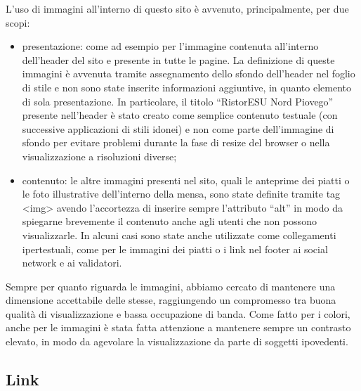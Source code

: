 \documentclass[10pt,a4paper,onecolumn]{article}
\begin{document}
L’uso di immagini all’interno di questo sito è avvenuto, principalmente, per due scopi:
\begin{itemize}
 \item presentazione: come ad esempio per l’immagine contenuta all’interno dell’header del sito e presente in tutte le pagine. La definizione di queste immagini è avvenuta tramite assegnamento dello sfondo dell’header nel foglio di stile e non sono state inserite informazioni aggiuntive, in quanto elemento di sola presentazione. In particolare, il titolo ``RistorESU Nord Piovego'' presente nell’header è stato creato come semplice contenuto testuale (con successive applicazioni di stili idonei) e non come parte dell’immagine di sfondo per evitare problemi durante la fase di resize del browser o nella visualizzazione a risoluzioni diverse;
 \item contenuto: le altre immagini presenti nel sito, quali le anteprime dei piatti o le foto illustrative dell’interno della mensa, sono state definite tramite tag <img> avendo l’accortezza di inserire sempre l’attributo ``alt'' in modo da spiegarne brevemente il contenuto anche agli utenti che non possono visualizzarle.  In alcuni casi sono state anche utilizzate come collegamenti ipertestuali, come per le immagini dei piatti o i link nel footer ai social network e ai validatori.
\end{itemize}
Sempre per quanto riguarda le immagini, abbiamo cercato di mantenere una dimensione accettabile delle stesse, raggiungendo un compromesso tra buona qualità di visualizzazione e bassa occupazione di banda. Come fatto per i colori, anche per le immagini è stata fatta attenzione a mantenere sempre un contrasto elevato, in modo da agevolare la visualizzazione da parte di soggetti ipovedenti.

\subsection{Link}
\end{document}
